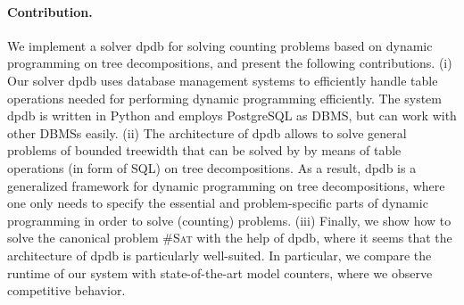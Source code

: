 \documentclass{llncs}
\newcommand{\cSAT}{\textsc{\#Sat}\xspace}%
\newcommand{\dpdb}{{\small\textsf{dpdb}}\xspace}
\begin{document}
\paragraph{Contribution.}  
We implement a solver \dpdb for solving counting problems based on dynamic programming on tree decompositions,
and present the following contributions.
(i) Our solver \dpdb uses database management systems to efficiently handle table operations needed
for performing dynamic programming efficiently. The system \dpdb is written in Python and employs PostgreSQL as DBMS,
but can work with other DBMSs easily.
(ii) The architecture of \dpdb allows to solve general problems of bounded treewidth that can be solved by
by means of table operations (in form of SQL) on tree decompositions. As a result, \dpdb is a generalized framework 
for dynamic programming on tree decompositions, where one only needs to specify the essential and problem-specific parts of dynamic programming
in order to solve (counting) problems.
(iii) Finally, we show how to solve the canonical problem \cSAT with the help of \dpdb, 
where it seems that the architecture of \dpdb
is particularly well-suited. In particular, we compare the runtime of
our system with state-of-the-art model counters, where we observe competitive behavior.
%
\end{document}
